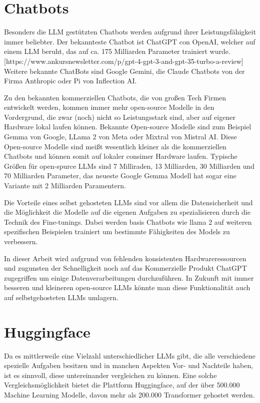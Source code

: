 \section{Chatbots}

Besonders die LLM gestützten Chatbots werden aufgrund ihrer Leistungsfähigkeit immer beliebter.
Der bekannteste Chatbot ist ChatGPT con OpenAI, welcher auf einem LLM beruht, das auf ca. 175 Milliarden Parameter trainiert wurde. [https://www.ankursnewsletter.com/p/gpt-4-gpt-3-and-gpt-35-turbo-a-review]
Weitere bekannte ChatBots sind Google Gemini, die Claude Chatbots von der Firma Anthropic oder Pi von Inflection AI.

Zu den bekannten kommerziellen Chatbots, die von großen Tech Firmen entwickelt werden, kommen immer mehr open-source Modelle in den Vordergrund, die zwar (noch) nicht so Leistungsstark sind, aber auf eigener Hardware lokal laufen können.
Bekannte Open-source Modelle sind zum Beispiel Gemma von Google, LLama 2 von Meta oder Mixtral von Mistral AI.
Diese Open-source Modelle sind meißt wesentlich kleiner als die kommerziellen Chatbots und können somit auf lokaler consimer Hardware laufen.
Typische Größen für open-spurce LLMs sind 7 Milliraden, 13 Milliarden, 30 Milliarden und 70 Milliarden Parameter, das neueste Google Gemma Modell hat sogar eine Variante mit 2 Milliarden Paramentern.


Die Vorteile eines selbst gehosteten LLMs sind vor allem die Datensicherheit und die Möglichkeit die Modelle auf die eigenen Aufgaben zu spezialisieren durch die Technik des Fine-tunings.
Dabei werden basis Chatbots wie llama 2 auf weiteren spezifischen Beispielen trainiert um bestimmte Fähigkeiten des Models zu verbessern.

In dieser Arbeit wird aufgrund von fehlenden konsistenten Hardwareressourcen und zugunsten der Schnelligkeit noch auf das Kommerzielle Produkt ChatGPT zugegriffen um einige Datenverarbeitungen durchzuführen.
In Zukunft mit immer besseren und kleineren open-source LLMs könnte man diese Funktionalität auch auf selbstgehosteten LLMs umlagern.

\section{Huggingface}

Da es mittlerweile eine Vielzahl unterschiedlicher LLMs gibt, die alle verschiedene spezielle Aufgaben besitzen und in manchen Aspekten Vor- und Nachteile haben, ist es sinnvoll, diese untereinander vergleichen zu können.
Eine solche Vergleichsmöglichkeit bietet die Plattform Huggingface, auf der über 500.000 Machine Learning Modelle, davon mehr als 200.000 Transformer gehostet werden.

